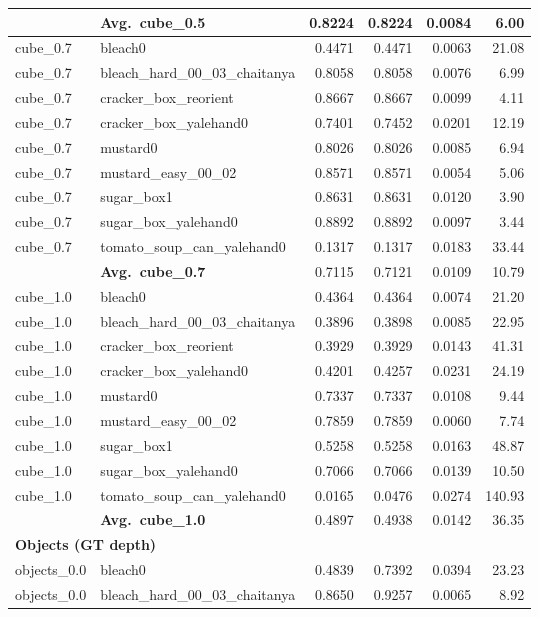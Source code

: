 \begin{longtable}{llrrrr}
  \cmidrule{2-6}
  & \textbf{Avg.~cube_0.5} & 0.8224 & 0.8224 & 0.0084 & 6.00 \\
  \midrule
  cube_0.7 & bleach0 & 0.4471 & 0.4471 & 0.0063 & 21.08 \\
  cube_0.7 & bleach\_hard\_00\_03\_chaitanya & 0.8058 & 0.8058 & 0.0076 & 6.99 \\
  cube_0.7 & cracker\_box\_reorient & 0.8667 & 0.8667 & 0.0099 & 4.11 \\
  cube_0.7 & cracker\_box\_yalehand0 & 0.7401 & 0.7452 & 0.0201 & 12.19 \\
  cube_0.7 & mustard0 & 0.8026 & 0.8026 & 0.0085 & 6.94 \\
  cube_0.7 & mustard\_easy\_00\_02 & 0.8571 & 0.8571 & 0.0054 & 5.06 \\
  cube_0.7 & sugar\_box1 & 0.8631 & 0.8631 & 0.0120 & 3.90 \\
  cube_0.7 & sugar\_box\_yalehand0 & 0.8892 & 0.8892 & 0.0097 & 3.44 \\
  cube_0.7 & tomato\_soup\_can\_yalehand0 & 0.1317 & 0.1317 & 0.0183 & 33.44 \\
  \cmidrule{2-6}
  & \textbf{Avg.~cube_0.7} & 0.7115 & 0.7121 & 0.0109 & 10.79 \\
  \midrule
  cube_1.0 & bleach0 & 0.4364 & 0.4364 & 0.0074 & 21.20 \\
  cube_1.0 & bleach\_hard\_00\_03\_chaitanya & 0.3896 & 0.3898 & 0.0085 & 22.95 \\
  cube_1.0 & cracker\_box\_reorient & 0.3929 & 0.3929 & 0.0143 & 41.31 \\
  cube_1.0 & cracker\_box\_yalehand0 & 0.4201 & 0.4257 & 0.0231 & 24.19 \\
  cube_1.0 & mustard0 & 0.7337 & 0.7337 & 0.0108 & 9.44 \\
  cube_1.0 & mustard\_easy\_00\_02 & 0.7859 & 0.7859 & 0.0060 & 7.74 \\
  cube_1.0 & sugar\_box1 & 0.5258 & 0.5258 & 0.0163 & 48.87 \\
  cube_1.0 & sugar\_box\_yalehand0 & 0.7066 & 0.7066 & 0.0139 & 10.50 \\
  cube_1.0 & tomato\_soup\_can\_yalehand0 & 0.0165 & 0.0476 & 0.0274 & 140.93 \\
  \cmidrule{2-6}
  & \textbf{Avg.~cube_1.0} & 0.4897 & 0.4938 & 0.0142 & 36.35 \\
  \midrule
\multicolumn{6}{l}{\textbf{Objects (GT depth)}} \\
\midrule
  objects_0.0 & bleach0 & 0.4839 & 0.7392 & 0.0394 & 23.23 \\
  objects_0.0 & bleach\_hard\_00\_03\_chaitanya & 0.8650 & 0.9257 & 0.0065 & 8.92 \\

\end{longtable}
